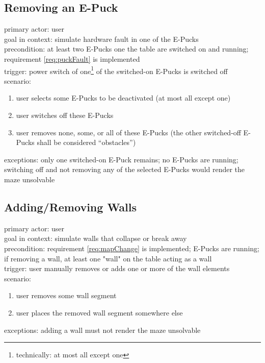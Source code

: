 \documentclass[a4paper,parskip,headheight=38pt]{scrartcl} %
\begin{document}
\subsection{Removing an E-Puck}
primary actor: user \\
goal in context: simulate hardware fault in one of the E-Pucks \\
precondition: at least two E-Pucks one the table are switched on and running; requirement \ref{req:puckFault} is implemented \\
trigger: power switch of one\footnote{technically: at most all except one} of the switched-on E-Pucks is switched off \\
scenario:
\begin{enumerate}[label={\arabic*.}]
	\item user selects some E-Pucks to be deactivated (at most all except one)
	\item user switches off these E-Pucks
	\item user removes none, some, or all of these E-Pucks (the other switched-off E-Pucks shall be considered \enquote{obstacles})
\end{enumerate}
exceptions: only one switched-on E-Puck remains; no E-Pucks are running; switching off and not removing any of the selected E-Pucks would render the maze unsolvable

\subsection{Adding/Removing Walls}
primary actor: user \\
goal in context: simulate walls that collapse or break away \\
precondition: requirement \ref{req:mapChange} is implemented; E-Pucks are running; if removing a wall, at least one "wall" on the table acting as a wall \\
trigger: user manually removes or adds one or more of the wall elements \\
scenario:
\begin{enumerate}[label={\arabic*.}]
	\item user removes some wall segment
	\item user places the removed wall segment somewhere else
\end{enumerate}
exceptions: adding a wall must not render the maze unsolvable
\end{document}
